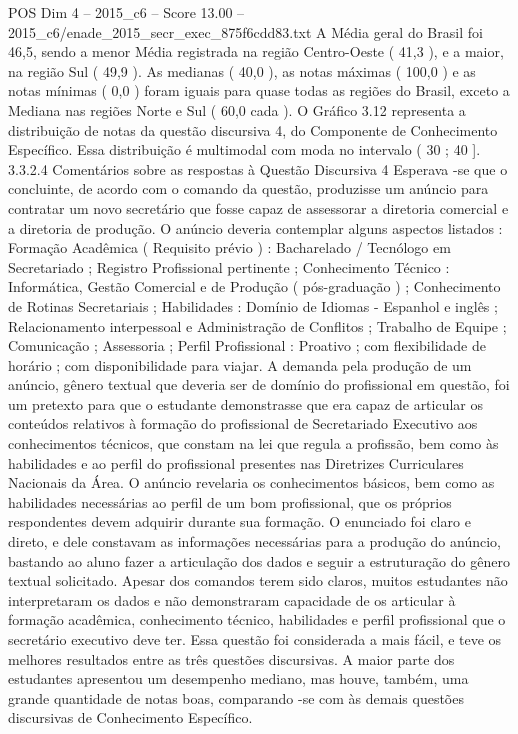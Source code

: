 \begin{textsample}{POS Dim 4 – 2015\_c6 – Score 13.00 – 2015\_c6/enade\_2015\_secr\_exec\_875f6cdd83.txt}
A Média geral do Brasil foi 46,5, sendo a menor Média registrada na região Centro-Oeste ( 41,3 ), e a maior, na região Sul ( 49,9 ).
As medianas ( 40,0 ), as notas máximas ( 100,0 ) e as notas mínimas ( 0,0 ) foram iguais para quase todas as regiões do Brasil, exceto a Mediana nas regiões Norte e Sul ( 60,0 cada ).
O Gráfico 3.12 representa a distribuição de notas da questão discursiva 4, do Componente de Conhecimento Específico.
Essa distribuição é multimodal com moda no intervalo ( 30 ; 40 ]. 3.3.2.4 Comentários sobre as respostas à Questão Discursiva 4 Esperava -se que o concluinte, de acordo com o comando da questão, produzisse um anúncio para contratar um novo secretário que fosse capaz de assessorar a diretoria comercial e a diretoria de produção.
O anúncio deveria contemplar alguns aspectos listados : Formação Acadêmica ( Requisito prévio ) : Bacharelado / Tecnólogo em Secretariado ; Registro Profissional pertinente ; Conhecimento Técnico : Informática, Gestão Comercial e de Produção ( pós-graduação ) ; Conhecimento de Rotinas Secretariais ; Habilidades : Domínio de Idiomas - Espanhol e inglês ; Relacionamento interpessoal e Administração de Conflitos ; Trabalho de Equipe ; Comunicação ; Assessoria ; Perfil Profissional : Proativo ; com flexibilidade de horário ; com disponibilidade para viajar.
A demanda pela produção de um anúncio, gênero textual que deveria ser de domínio do profissional em questão, foi um pretexto para que o estudante demonstrasse que era capaz de articular os conteúdos relativos à formação do profissional de Secretariado Executivo aos conhecimentos técnicos, que constam na lei que regula a profissão, bem como às habilidades e ao perfil do profissional presentes nas Diretrizes Curriculares Nacionais da Área.
O anúncio revelaria os conhecimentos básicos, bem como as habilidades necessárias ao perfil de um bom profissional, que os próprios respondentes devem adquirir durante sua formação.
O enunciado foi claro e direto, e dele constavam as informações necessárias para a produção do anúncio, bastando ao aluno fazer a articulação dos dados e seguir a estruturação do gênero textual solicitado.
Apesar dos comandos terem sido claros, muitos estudantes não interpretaram os dados e não demonstraram capacidade de os articular à formação acadêmica, conhecimento técnico, habilidades e perfil profissional que o secretário executivo deve ter.
Essa questão foi considerada a mais fácil, e teve os melhores resultados entre as três questões discursivas.
A maior parte dos estudantes apresentou um desempenho mediano, mas houve, também, uma grande quantidade de notas boas, comparando -se com às demais questões discursivas de Conhecimento Específico.

\end{textsample}
